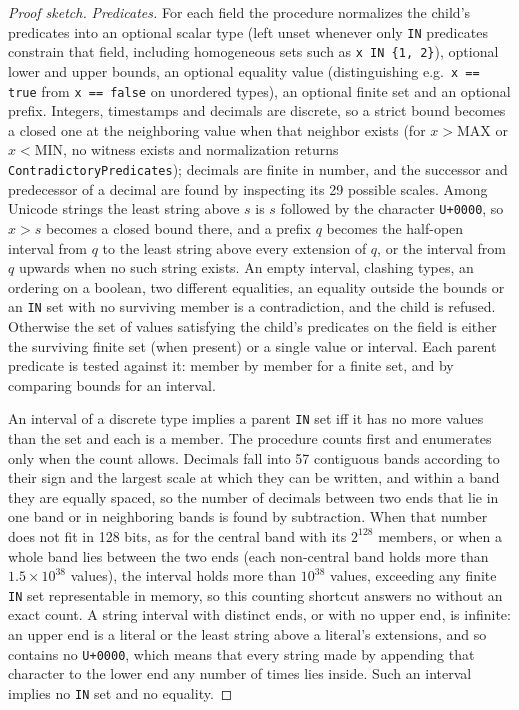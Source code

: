\documentclass[10pt,twocolumn]{article}
\theoremstyle{plain}
\theoremstyle{definition}
\begin{document}
\begin{proof}[Proof sketch]
\emph{Predicates.} For each field the procedure normalizes the child's predicates into an optional scalar type (left unset whenever only \texttt{IN} predicates constrain that field, including homogeneous sets such as \texttt{x IN \{1, 2\}}), optional lower and upper bounds, an optional equality value (distinguishing e.g.\ \texttt{x == true} from \texttt{x == false} on unordered types), an optional finite set and an optional prefix. Integers, timestamps and decimals are discrete, so a strict bound becomes a closed one at the neighboring value when that neighbor exists (for $x > \mathrm{MAX}$ or $x < \mathrm{MIN}$, no witness exists and normalization returns \texttt{ContradictoryPredicates}); decimals are finite in number, and the successor and predecessor of a decimal are found by inspecting its 29 possible scales. Among Unicode strings the least string above $s$ is $s$ followed by the character \texttt{U+0000}, so $x > s$ becomes a closed bound there, and a prefix $q$ becomes the half-open interval from $q$ to the least string above every extension of $q$, or the interval from $q$ upwards when no such string exists. An empty interval, clashing types, an ordering on a boolean, two different equalities, an equality outside the bounds or an \texttt{IN} set with no surviving member is a contradiction, and the child is refused. Otherwise the set of values satisfying the child's predicates on the field is either the surviving finite set (when present) or a single value or interval. Each parent predicate is tested against it: member by member for a finite set, and by comparing bounds for an interval.

An interval of a discrete type implies a parent \texttt{IN} set iff it has no more values than the set and each is a member. The procedure counts first and enumerates only when the count allows. Decimals fall into 57 contiguous bands according to their sign and the largest scale at which they can be written, and within a band they are equally spaced, so the number of decimals between two ends that lie in one band or in neighboring bands is found by subtraction. When that number does not fit in 128 bits, as for the central band with its $2^{128}$ members, or when a whole band lies between the two ends (each non-central band holds more than $1.5 \times 10^{38}$ values), the interval holds more than $10^{38}$ values, exceeding any finite \texttt{IN} set representable in memory, so this counting shortcut answers no without an exact count. A string interval with distinct ends, or with no upper end, is infinite: an upper end is a literal or the least string above a literal's extensions, and so contains no \texttt{U+0000}, which means that every string made by appending that character to the lower end any number of times lies inside. Such an interval implies no \texttt{IN} set and no equality.


\end{proof}
\end{document}
